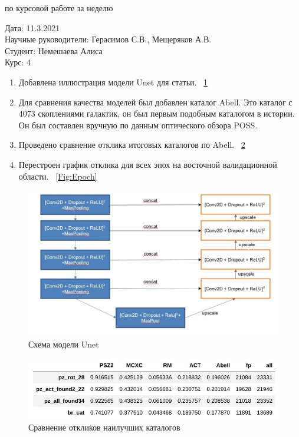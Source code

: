 \documentclass{article}
\begin{document}
\begin{center}{ по курсовой работе за неделю\\}\end{center}
Дата: 11.3.2021\\
Научные руководители: Герасимов С.В., Мещеряков А.В.\\
Студент: Немешаева Алиса\\
Курс: 4\\

\renewcommand{\labelitemi}{$\blacksquare$}
\renewcommand\labelitemii{$\square$}
\begin{enumerate}
    \item Добавлена иллюстрация модели Unet для статьи. 
        ~\ref{Fig:Unet}{}\\
    \item Для сравнения качества моделей был добавлен каталог Abell. Это каталог с 4073 скоплениями 
        галактик, он был первым подобным каталогом в истории. Он был составлен вручную по данным 
        оптического обзора POSS.\\
    \item Проведено сравнение отклика итоговых каталогов по Abell.
        ~\ref{Fig:Recall}{}\\
    \item Перестроен график отклика для всех эпох на восточной валидационной области.
        ~\ref{Fig:Epoch}{}\\
\end{enumerate}




\begin{figure}[h]
\includegraphics[width=0.8\linewidth]{unet}
\caption{Схема модели Unet}
\label{Fig:Unet}
\end{figure}
\begin{figure}[h]
\includegraphics[width=0.8\linewidth]{recall}
\caption{Сравнение откликов наилучших каталогов}
\label{Fig:Recall}
\end{figure}
\end{document}
